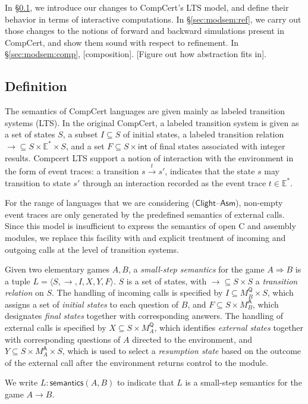 \documentclass[acmsmall,timestamp,review]{acmart}
\newcommand{\kw}[1]{\ensuremath{ \mathsf{#1} }}
\begin{document}
In \S\ref{sec:modsem:def},
we introduce our changes to CompCert's LTS model,
and define their behavior in terms of interactive computations.
In \S\ref{sec:modsem:ref},
we carry out those changes to the notions of
forward and backward simulations
present in CompCert,
and show them sound with respect to refinement.
In \S\ref{sec:modsem:comp},
[composition].
[Figure out how abstraction fits in].


\subsection{Definition} %
\label{sec:modsem:def}

The semantics of CompCert languages are given mainly
as labeled transition systems (LTS).
In the original CompCert,
a labeled transition system is given as
a set of states $S$,
a subset $I \subseteq S$ of initial states,
a labeled transition relation
${\rightarrow} \subseteq S \times \mathbb{E}^* \times S$,
and a set
$F \subseteq S \times \kw{int}$
of final states associated with integer results.
Compcert LTS support a notion of interaction with the environment
in the form of event traces:
a transition $s \stackrel{t}{\rightarrow} s'$,
indicates that the state $s$ may transition to state $s'$
through an interaction recorded as the event trace $t \in \mathbb{E}^*$.

For the range of languages that we are considering
($\kw{Clight}$--$\kw{Asm}$),
non-empty event traces are only generated by
the predefined semantics of external calls.
Since this model is insufficient to express
the semantics of open C and assembly modules,
we replace this facility with
and explicit treatment of incoming and outgoing calls
at the level of transition systems.

\begin{definition}
Given two elementary games $A, B$,
a \emph{small-step semantics} for the game $A \Rightarrow B$
is a tuple $L = \langle S, \rightarrow, I, X, Y, F \rangle$.
$S$ is a set of states,
with ${\rightarrow} \subseteq S \times S$ a \emph{transition relation} on $S$.
The handling of incoming calls is specified by
$I \subseteq M_B^\kw{Q} \times S$, which
assigns a set of \emph{initial states} to each question of $B$, and
$F \subseteq S \times M_B^\kw{A}$,
which designates \emph{final states} together with corresponding answers.
The handling of external calls is specified by
$X \subseteq S \times M_A^\kw{Q}$,
which identifies \emph{external states} together with
corresponding questions of $A$ directed to the environment, and
$Y \subseteq S \times M_A^\kw{A} \times S$,
which is used to select a \emph{resumption state}
based on the outcome of the external call
after the environment returns control to the module.

We write $L : \kw{semantics}(A, B)$ to indicate that
$L$ is a small-step semantics for the game $A \rightarrow B$.
\end{definition}
\end{document}
